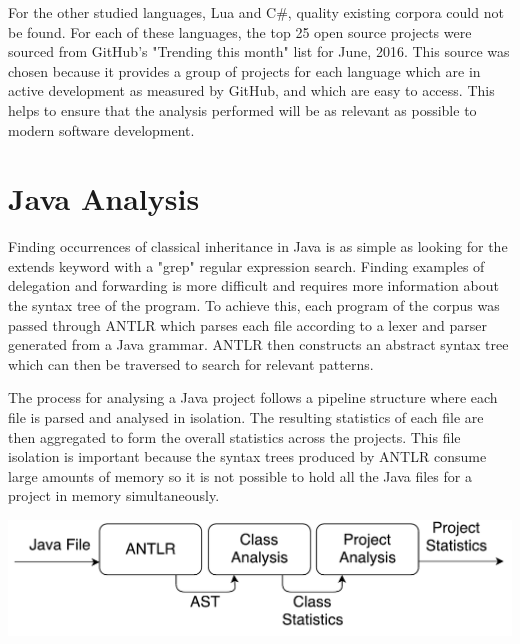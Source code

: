 For the other studied languages, Lua and C\#, quality existing corpora could not be found. For each of these languages, the top 25 open source projects were sourced from GitHub's "Trending this month" list for June, 2016. This source was chosen because it provides a group of projects for each language which are in active development as measured by GitHub, and which are easy to access. This helps to ensure that the analysis performed will be as relevant as possible to modern software development.

\section{Java Analysis}
Finding occurrences of classical inheritance in Java is as simple as looking for the extends keyword with a "grep" regular expression search. Finding examples of delegation and forwarding is more difficult and requires more information about the syntax tree of the program. To achieve this, each program of the corpus was passed through ANTLR which parses each file according to a lexer and parser generated from a Java grammar. ANTLR then constructs an abstract syntax tree which can then be traversed to search for relevant patterns.
\newline

The process for analysing a Java project follows a pipeline structure where each file is parsed and analysed in isolation. The resulting statistics of each file are then aggregated to form the overall statistics across the projects. This file isolation is important because the syntax trees produced by ANTLR consume large amounts of memory so it is not possible to hold all the Java files for a project in memory simultaneously.
\newline

\begin{center}
	\includegraphics[scale=0.70]{AntlrPipeline.pdf}
\end{center}

